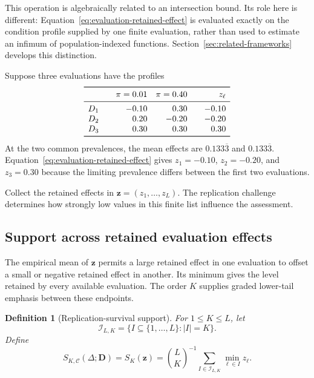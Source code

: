 \documentclass[11pt]{article}
\newcommand{\CSet}{\mathcal{C}}
\newtheorem{definition}{Definition}
\theoremstyle{remark}
\begin{document}
This operation is algebraically related to an intersection bound. Its role here
is different: Equation~\eqref{eq:evaluation-retained-effect} is evaluated
exactly on the condition profile supplied by one finite evaluation, rather than
used to estimate an infimum of population-indexed functions. Section~\ref{sec:related-frameworks}
develops this distinction.

Suppose three evaluations have the profiles
\[
\begin{array}{c@{\qquad}rr@{\qquad}r}
\toprule
& \pi=0.01 & \pi=0.40 & z_\ell \\
\midrule
D_1 & -0.10 & \phantom{-}0.30 & -0.10 \\
D_2 & \phantom{-}0.20 & -0.20 & -0.20 \\
D_3 & \phantom{-}0.30 & \phantom{-}0.30 & \phantom{-}0.30 \\
\bottomrule
\end{array}
\]
At the two common prevalences, the mean effects are $0.133\overline{3}$ and
$0.133\overline{3}$. Equation~\eqref{eq:evaluation-retained-effect} gives
$z_1=-0.10$, $z_2=-0.20$, and $z_3=0.30$ because the limiting prevalence
differs between the first two evaluations.

Collect the retained effects in $\mathbf z=(z_1,\ldots,z_L)$. The replication challenge determines how strongly low values in this finite list influence the assessment.

\subsection{Support across retained evaluation effects}

The empirical mean of $\mathbf z$ permits a large retained effect in one evaluation to offset a small or negative retained effect in another. Its minimum gives the level retained by every available evaluation. The order $K$ supplies graded lower-tail emphasis between these endpoints.

\begin{definition}[Replication-survival support]
\label{def:support}
For $1\leq K\leq L$, let
\[
\mathcal I_{L,K}
=
\{I\subseteq\{1,\ldots,L\}:|I|=K\}.
\]
Define
\begin{equation}
S_{K,\CSet}(\Delta;\mathbf D)
=
S_K(\mathbf z)
=
\binom{L}{K}^{-1}
\sum_{I\in\mathcal I_{L,K}}
\min_{\ell\in I}z_\ell.
\label{eq:robust-support}
\end{equation}
\end{definition}
\end{document}
